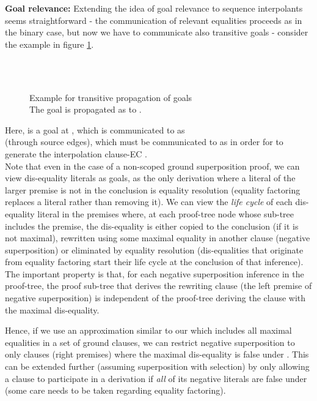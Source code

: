 \textbf{Goal relevance:}
Extending the idea of goal relevance to sequence interpolants seems straightforward - the communication of relevant equalities proceeds as in the binary case, but now we have to communicate also transitive goals - consider the  example in figure \ref{example_4.2.2.3}.

\begin{figure}
\\
\\
\caption{Example for transitive propagation of goals\\
The goal  is propagated as  to .}
\label{example_4.2.2.3}
\end{figure}

\noindent
Here,  is a goal at , which is communicated to  as \\
 (through source edges), 
which must be communicated to  as  in order for  to generate the interpolation clause-EC .\\
Note that even in the case of a non-scoped ground superposition proof, we can view dis-equality literals as goals, 
as the only derivation where a literal of the larger premise is not in the conclusion is equality resolution (equality factoring replaces a literal rather than removing it). We can view the \emph{life cycle} of each dis-equality literal in the premises where, at each proof-tree node whose sub-tree includes the premise, the dis-equality is either copied to the conclusion (if it is not maximal), rewritten using some maximal equality in another clause (negative superposition) or eliminated by equality resolution (dis-equalities that originate from equality factoring start their life cycle at the conclusion of that inference). \\
The important property is that, for each negative superposition inference in the proof-tree, the proof sub-tree that derives the rewriting clause (the left premise of negative superposition) is independent of the proof-tree deriving the clause with the maximal dis-equality.

Hence, if we use an approximation similar to our  which includes all maximal equalities in a set of ground clauses, 
we can restrict negative superposition to only clauses (right premises) where the maximal dis-equality is false under . 
This can be extended further (assuming superposition with selection) by only allowing a clause to participate in a derivation if \emph{all} of its negative literals are false under  (some care needs to be taken regarding equality factoring).

